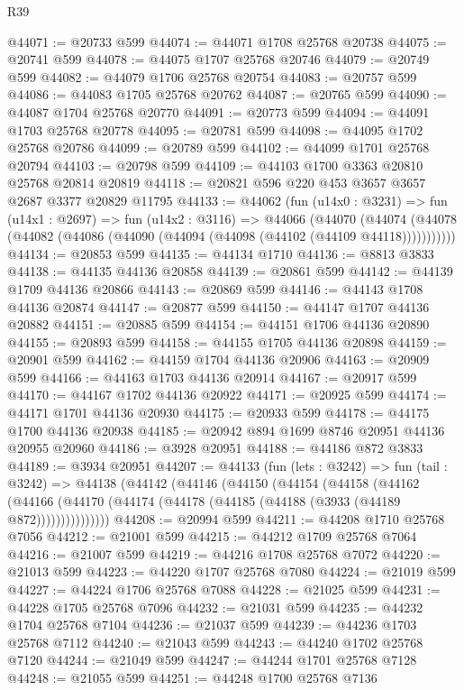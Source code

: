\begin{lexlean}{R39}
\begin{coremodule}
@44071 := @20733 @599
@44074 := @44071 @1708 @25768 @20738
@44075 := @20741 @599
@44078 := @44075 @1707 @25768 @20746
@44079 := @20749 @599
@44082 := @44079 @1706 @25768 @20754
@44083 := @20757 @599
@44086 := @44083 @1705 @25768 @20762
@44087 := @20765 @599
@44090 := @44087 @1704 @25768 @20770
@44091 := @20773 @599
@44094 := @44091 @1703 @25768 @20778
@44095 := @20781 @599
@44098 := @44095 @1702 @25768 @20786
@44099 := @20789 @599
@44102 := @44099 @1701 @25768 @20794
@44103 := @20798 @599
@44109 := @44103 @1700 @3363 @20810 @25768 @20814 @20819
@44118 := @20821 @596 @220 @453 @3657 @3657 @2687 @3377 @20829 @11795
@44133 := @44062
    (fun (u14x0 : @3231) =>
    fun (u14x1 : @2697) =>
    fun (u14x2 : @3116) =>
    @44066
      (@44070
        (@44074 (@44078 (@44082 (@44086 (@44090 (@44094 (@44098 (@44102 (@44109 @44118)))))))))))
@44134 := @20853 @599
@44135 := @44134 @1710
@44136 := @8813 @3833
@44138 := @44135 @44136 @20858
@44139 := @20861 @599
@44142 := @44139 @1709 @44136 @20866
@44143 := @20869 @599
@44146 := @44143 @1708 @44136 @20874
@44147 := @20877 @599
@44150 := @44147 @1707 @44136 @20882
@44151 := @20885 @599
@44154 := @44151 @1706 @44136 @20890
@44155 := @20893 @599
@44158 := @44155 @1705 @44136 @20898
@44159 := @20901 @599
@44162 := @44159 @1704 @44136 @20906
@44163 := @20909 @599
@44166 := @44163 @1703 @44136 @20914
@44167 := @20917 @599
@44170 := @44167 @1702 @44136 @20922
@44171 := @20925 @599
@44174 := @44171 @1701 @44136 @20930
@44175 := @20933 @599
@44178 := @44175 @1700 @44136 @20938
@44185 := @20942 @894 @1699 @8746 @20951 @44136 @20955 @20960
@44186 := @3928 @20951
@44188 := @44186 @872 @3833
@44189 := @3934 @20951
@44207 := @44133
    (fun (lets : @3242) =>
    fun (tail : @3242) =>
    @44138
      (@44142
        (@44146
          (@44150
            (@44154
              (@44158
                (@44162
                  (@44166 (@44170 (@44174 (@44178 (@44185 (@44188 (@3933 (@44189 @872)))))))))))))))
@44208 := @20994 @599
@44211 := @44208 @1710 @25768 @7056
@44212 := @21001 @599
@44215 := @44212 @1709 @25768 @7064
@44216 := @21007 @599
@44219 := @44216 @1708 @25768 @7072
@44220 := @21013 @599
@44223 := @44220 @1707 @25768 @7080
@44224 := @21019 @599
@44227 := @44224 @1706 @25768 @7088
@44228 := @21025 @599
@44231 := @44228 @1705 @25768 @7096
@44232 := @21031 @599
@44235 := @44232 @1704 @25768 @7104
@44236 := @21037 @599
@44239 := @44236 @1703 @25768 @7112
@44240 := @21043 @599
@44243 := @44240 @1702 @25768 @7120
@44244 := @21049 @599
@44247 := @44244 @1701 @25768 @7128
@44248 := @21055 @599
@44251 := @44248 @1700 @25768 @7136

\end{coremodule}
\end{lexlean}
